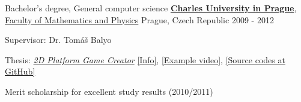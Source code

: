 \begin{cventries}
  \cventry
{Bachelor's degree, General computer science} %
{\href{http://cuni.cz}{\textbf{Charles University in Prague}}, \href{http://www.mff.cuni.cz}
	{Faculty of Mathematics and Physics}} %
{Prague, Czech Republic} %
{2009 - 2012} %
{
	\begin{cvitems} %
		\item {Supervisor: Dr. Tomáš Balyo}
		\item {Thesis: \href{http://milanrybar.cz/2pgc}{\emph{2D Platform Game Creator}}
		\href{http://milanrybar.cz/2pgc}{[Info]}, 
		\href{https://www.youtube.com/watch?v=WxjpEEXgAvo}{[Example video]}, 
		\href{https://github.com/milan-rybar/2D-Platform-Game-Creator}{[Source codes at GitHub]}
		}
		\item {Merit scholarship for excellent study results (2010/2011)}
	\end{cvitems}
}

\end{cventries}
